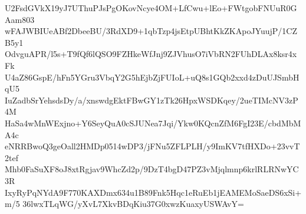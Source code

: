U2FsdGVkX19yJ7UThuPJsPgOKovNcye4OM+LfCwu+lEo+FWtgobFNUuR0GAam803
wFAJWBIUeABf2DbeeBU/3RdXD9+1qbTzp4jsEtpUBhtKkZKApoJYuujP/1CZB5y1
OdvguAPR/l5s+T9fQf6lQSO9FZHkeWfJnj9ZJVhusO7iVbRN2FUhDLAx8ksr4xFk
U4aZ86GspE/hFn5YGru3VbqY2G5hEjbZjFUIoL+uQ8s1GQb2xxd4zDuUJSmbHqU5
IuZadbSrYehsdsDy/a/xnswdgEktFBwGY1zTk26HpxWSDKqey/2ueTIMcNV3zP4M
HaSa4wMnWExjno+Y6SeyQuA0cSJUNea7Jqi/Ykw0KQcnZfM6FgI23E/cbdMbMA4c
eNRRBwoQ3geOall2HMDp0514wDP3/jFNu5ZFLPLH/y9ImKV7tfHXDo+23vvT2tef
Mhb0FaSuXF8oJ8xtRgjav9WhcZd2p/9DzT4bgD47PZ3vMjqlmnp6krlRLRNwYC3R
IxyRyPqNYdA9F770KAXDmx634u1B89Fnk5Hqc1eRuEb1jEAMEMoSaeDS6xSi+m/5
36lwxTLqWG/yXvL7XkvBDqKiu37G0xwzKuaxyUSWAvY=
